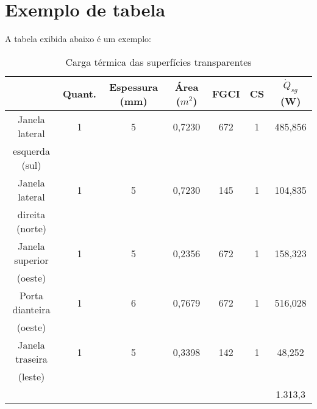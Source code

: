 \documentclass[12pt,oneside,english,brazil,lmodern]{ucsmonograph}
\begin{document}
	\section{Exemplo de tabela}
	A tabela exibida abaixo é um exemplo:
	\begin{table}[h]
		\centering
		\caption{Carga térmica das superfícies transparentes}
		\setlength{\doublerulesep}{\arrayrulewidth}
		\begin{tabular}{c|c|c|c|c|c|c}
			\hline
			\hline
			& Quant. & Espessura (mm) & Área ($m^2$) & FGCI & CS & $\dot{Q}_{sg}$ (W) \\ \hline
			Janela lateral  & 1 & 5 & 0,7230 & 672 & 1 & 485,856  \\ 
			esquerda (sul)  &   &   &        &     &   &          \\ 
			Janela lateral  & 1 & 5 & 0,7230 & 145 & 1 &  104,835 \\
			direita (norte) &   &   &        &     &   &          \\
			Janela superior & 1 & 5 & 0,2356 & 672 & 1 & 158,323  \\
			(oeste)         &   &   &        &     &   &          \\
			Porta dianteira & 1 & 6 & 0,7679 & 672 & 1 & 516,028  \\
			(oeste)         &   &   &        &     &   &          \\
			Janela traseira & 1 & 5 & 0,3398 & 142 & 1 &  48,252  \\
			(leste)         &   &   &        &     &   &          \\ \hline 
			&   &   &        &     &   &  1.313,3 \\ \hline \hline 
		\end{tabular}
	\end{table}
	
	\postextual
	
	
	
\end{document}
